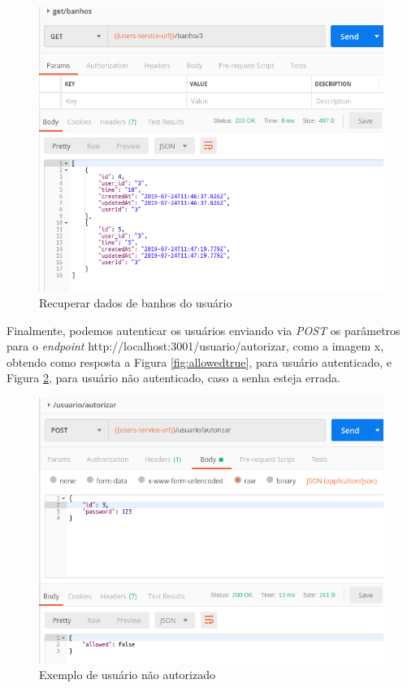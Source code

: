 \begin{figure}[htbp]
	\centering
	\includegraphics[width=0.7\linewidth]{figuras/postman/getbanhos.png}
	\caption{Recuperar dados de banhos do usuário}
	\label{fig:banhos}
\end{figure}

Finalmente, podemos autenticar os usuários enviando via \textit{POST} os parâmetros para o \textit{endpoint} http://localhost:3001/usuario/autorizar, como a imagem x, obtendo como resposta a Figura \ref{fig:allowedtrue}, para usuário autenticado, e Figura \ref{fig:allowedfalse}, para usuário não autenticado, caso a senha esteja errada.

\begin{figure}[htbp]
	\centering
	\includegraphics[width=0.7\linewidth]{figuras/postman/allowedfalse.png}
	\caption{Exemplo de usuário não autorizado}
	\label{fig:allowedfalse}
\end{figure}

